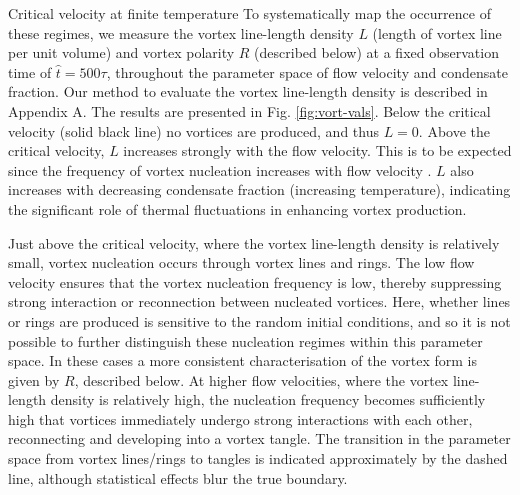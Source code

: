 \begin{chapter}{\label{cha:nonequib}Critical velocity at finite temperature}
To systematically map the occurrence of these regimes, we measure the vortex line-length density $L$ (length of vortex line per unit volume) and vortex polarity $R$ (described below) at a fixed observation time of $\hat{t}=500\tau$, throughout the parameter space of flow velocity and condensate fraction.  Our method to evaluate the vortex line-length density is described in Appendix A.  The results are presented in Fig. \ref{fig:vort-vals}.  Below the critical velocity (solid black line) no vortices are produced, and thus $L=0$.  Above the critical velocity, $L$ increases strongly with the flow velocity.  This is to be expected since the frequency of vortex nucleation increases with flow velocity \cite{frisch92}.  $L$ also increases with decreasing condensate fraction (increasing temperature), indicating the significant role of thermal fluctuations in enhancing vortex production.

Just above the critical velocity, where the vortex line-length density is relatively small, vortex nucleation occurs through vortex lines and rings.  The low flow velocity ensures that the vortex nucleation frequency is low, thereby suppressing strong interaction or reconnection between nucleated vortices.  Here, whether lines or rings are produced is sensitive to the random initial conditions, and so it is not possible to further distinguish these nucleation regimes within this parameter space. In these cases a more consistent characterisation of the vortex form is given by $R$, described below.   At higher flow velocities, where the vortex line-length density is relatively high, the nucleation frequency becomes sufficiently high that vortices immediately undergo strong interactions with each other, reconnecting and developing into a vortex tangle.  The transition in the parameter space from vortex lines/rings to tangles is indicated approximately by the dashed line, although statistical effects blur the true boundary.


\end{chapter}
